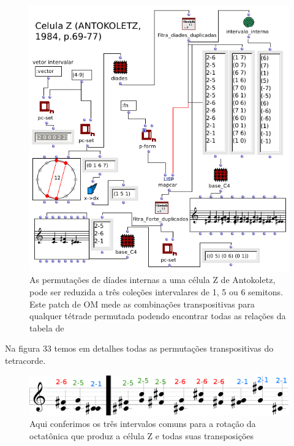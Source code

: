 \documentclass[
	12pt,				%
	openright,			%
	twoside,			%
	a4paper,			%
	english,			%
	french,				%
	spanish,			%
	brazil				%
	]{abntex2}
\begin{document}
\begin{figure}[!h]
	\caption{\label{fig_grafico} As permutações de díades internas a uma célula Z de Antokoletz, pode ser reduzida a três coleções intervalares de 1, 5 ou 6 semitons. Este patch de OM mede as combinações transpositivas para qualquer tétrade permutada podendo encontrar todas as relações da tabela de  }
	\begin{center}
	    \includegraphics[scale=0.5]{strategies/RotacionaZ.png}
	\end{center}
\end{figure}

Na figura 33 temos em detalhes todas as permutações transpositivas do tetracorde.

\begin{figure}[!h]
	\caption{\label{fig_grafico} Aqui conferimos os três intervalos comuns para a rotação da octatônica que produz a célula Z e todas suas transposições}
	\begin{center}
	    \includegraphics[scale=0.3]{strategies/strategieZCELL.png}
	\end{center}
\end{figure}
\pagebreak
\end{document}
